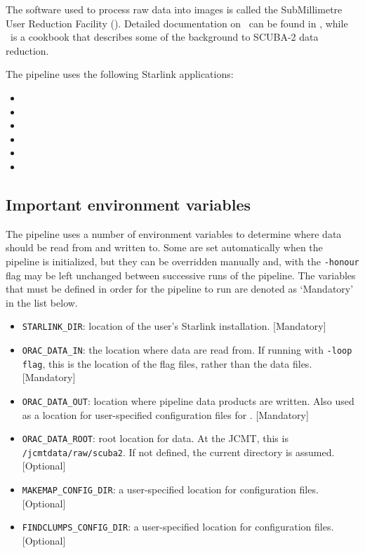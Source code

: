 The software used to process raw data into images is called the
SubMillimetre User Reduction Facility (\SMURF). Detailed documentation
on \SMURF\ can be found in \SMURFsun, while \SMURFcook\ is a cookbook
that describes some of the background to SCUBA-2 data reduction.

The pipeline uses the following Starlink applications:
\begin{itemize}
\item \SMURF
\item \KAPPA
\item \FLUXES
\item \FIGARO
\item \CCDPACK
\item \CUPID
\end{itemize}

\subsection{Important environment variables}

The pipeline uses a number of environment variables to determine where
data should be read from and written to. Some are set automatically
when the pipeline is initialized, but they can be overridden manually
and, with the \verb+-honour+ flag may be left unchanged between
successive runs of the pipeline. The variables that must be defined in
order for the pipeline to run are denoted as `Mandatory' in the list
below.

\begin{itemize}

\item \verb+STARLINK_DIR+: location of the user's Starlink
  installation. [Mandatory]

\item \verb+ORAC_DATA_IN+: the location where data are read from. If
  running with \verb+-loop flag+, this is the location of the flag
  files, rather than the data files. [Mandatory]

\item \verb+ORAC_DATA_OUT+: location where pipeline data products are
  written. Also used as a location for user-specified configuration
  files for . [Mandatory]

\item \verb+ORAC_DATA_ROOT+: root location for data. At the JCMT,
  this is \verb+/jcmtdata/raw/scuba2+. If not defined, the current
  directory is assumed. [Optional]

\item \verb+MAKEMAP_CONFIG_DIR+: a user-specified location for
   configuration files. [Optional]

\item \verb+FINDCLUMPS_CONFIG_DIR+: a user-specified location for
   configuration files. [Optional]

\end{itemize}

